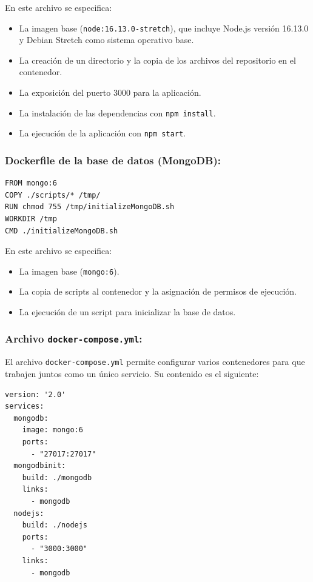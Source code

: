 En este archivo se especifica:
\begin{itemize}
    \item La imagen base (\texttt{node:16.13.0-stretch}), que incluye Node.js versión 16.13.0 y Debian Stretch como sistema operativo base.
    \item La creación de un directorio y la copia de los archivos del repositorio en el contenedor.
    \item La exposición del puerto 3000 para la aplicación.
    \item La instalación de las dependencias con \texttt{npm install}.
    \item La ejecución de la aplicación con \texttt{npm start}.
\end{itemize}

\subsubsection*{Dockerfile de la base de datos (MongoDB):}

\begin{verbatim}
FROM mongo:6
COPY ./scripts/* /tmp/
RUN chmod 755 /tmp/initializeMongoDB.sh
WORKDIR /tmp
CMD ./initializeMongoDB.sh
\end{verbatim}

En este archivo se especifica:
\begin{itemize}
    \item La imagen base (\texttt{mongo:6}).
    \item La copia de scripts al contenedor y la asignación de permisos de ejecución.
    \item La ejecución de un script para inicializar la base de datos.
\end{itemize}

\subsubsection*{Archivo \texttt{docker-compose.yml}:}

El archivo \texttt{docker-compose.yml} permite configurar varios contenedores para que trabajen juntos como un único servicio. Su contenido es el siguiente:

\begin{verbatim}
version: '2.0'
services:
  mongodb:
    image: mongo:6
    ports:
      - "27017:27017"
  mongodbinit:
    build: ./mongodb
    links:
      - mongodb
  nodejs:
    build: ./nodejs
    ports:
      - "3000:3000"
    links:
      - mongodb
\end{verbatim}

